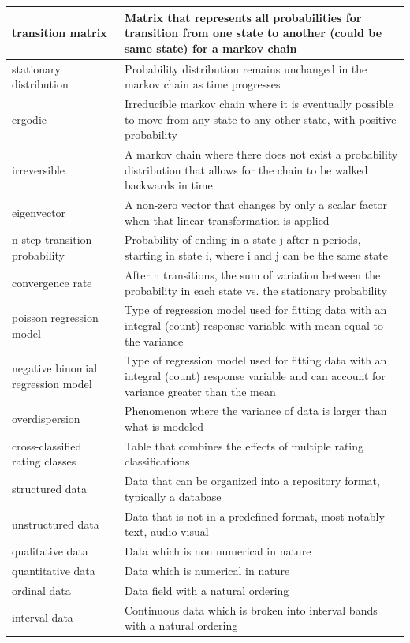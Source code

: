 \documentclass[
]{book}
\begin{document}
\begin{longtable}{>{\raggedright\arraybackslash}p{10em}|>{\raggedright\arraybackslash}p{30em}}
\hline
transition matrix & Matrix that represents all probabilities for transition from one state to another (could be same state) for a markov chain\\
\hline
stationary distribution & Probability distribution remains unchanged in the markov chain as time progresses\\
\hline
ergodic & Irreducible markov chain where it is eventually possible to move from any state to any other state, with positive probability\\
\hline
irreversible & A markov chain where there does not exist a probability distribution that allows for the chain to be walked backwards in time\\
\hline
eigenvector & A non-zero vector that changes by only a scalar factor when that linear transformation is applied\\
\hline
n-step transition probability & Probability of ending in a state j after n periods, starting in state i, where i and j can be the same state\\
\hline
convergence rate & After n transitions, the sum of variation between the probability in each state vs. the stationary probability\\
\hline
poisson regression model & Type of regression model used for fitting data with an integral (count) response variable with mean equal to the variance\\
\hline
negative binomial regression model & Type of regression model used for fitting data with an integral (count) response variable and can account for variance greater than the mean\\
\hline
overdispersion & Phenomenon where the variance of data is larger than what is modeled\\
\hline
cross-classified rating classes & Table that combines the effects of multiple rating classifications\\
\hline
structured data & Data that can be organized into a repository format, typically a database\\
\hline
unstructured data & Data that is not in a predefined format, most notably text, audio visual\\
\hline
qualitative data & Data which is non numerical in nature\\
\hline
quantitative data & Data which is numerical in nature\\
\hline
ordinal data & Data field with a natural ordering\\
\hline
interval data & Continuous data which is broken into interval bands with a natural ordering\\

\end{longtable}
\end{document}
